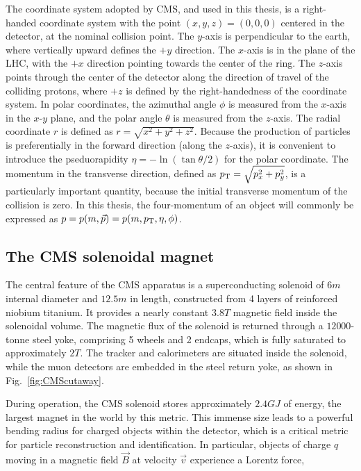 The coordinate system adopted by CMS, and used in this thesis,
is a right-handed coordinate system with the point $(x, y, z) = (0, 0, 0)$
centered in the detector, at the nominal collision point. The $y$-axis 
is perpendicular to the earth, where vertically upward defines the $+y$ direction.
The $x$-axis is in the plane of the LHC, with the $+x$ direction pointing towards
the center of the ring. The $z$-axis points through the center of the detector
along the direction of travel of the colliding protons, where $+z$ is defined
by the right-handedness of the coordinate system. In polar coordinates, 
the azimuthal angle $\phi$ is measured from the $x$-axis in the $x$-$y$
plane, and the polar angle $\theta$ is measured from the $z$-axis. The radial
coordinate $r$ is defined as $r = \sqrt{x^2 + y^2 + z^2}$.
Because the production of 
particles is preferentially in the forward direction (along
the $z$-axis), it is convenient to introduce the pseduorapidity $\eta = - \ln(\tan{\theta/2})$
for the polar coordinate. The momentum in the transverse direction,
defined as $p_{\mathrm{T}} = \sqrt{p_{x}^2 + p_{y}^2}$, is a particularly important quantity,
because the initial transverse momentum of the collision is zero.
In this thesis, the four-momentum of an object will commonly be expressed as
$p = p(m, \vec{p}) = p(m, p_{\mathrm{T}}, \eta, \phi)$.

\subsection{The CMS solenoidal magnet}

The central feature of the CMS apparatus is a superconducting solenoid 
of $6\unit{m}$ internal diameter and $12.5\unit{m}$ in length,
constructed from 4 layers of reinforced niobium titanium.
It provides a nearly constant $3.8\unit{T}$ magnetic field inside the solenoidal volume.
The magnetic flux of the solenoid is returned through
a $12 000$-tonne steel yoke, comprising 5 wheels and 2 endcaps,
which is fully saturated to approximately $2\unit{T}$. 
The tracker and calorimeters are situated inside the solenoid, while 
the muon detectors are embedded in the steel return yoke, as shown
in Fig.~\ref{fig:CMScutaway}.

During operation, the CMS solenoid stores approximately $2.4\unit{GJ}$ of 
energy, the largest magnet in the world by this metric. This immense
size leads to a powerful bending radius for charged objects within the detector,
which is a critical metric for particle reconstruction and identification.
In particular, objects of charge $q$ moving
in a magnetic field $\vec{B}$ at velocity $\vec{v}$ experience a Lorentz force,


